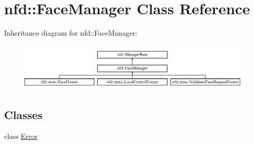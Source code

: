 \hypertarget{classnfd_1_1FaceManager}{}\section{nfd\+:\+:Face\+Manager Class Reference}
\label{classnfd_1_1FaceManager}
Inheritance diagram for nfd\+:\+:Face\+Manager\+:\begin{figure}[H]
\begin{center}
\leavevmode
\includegraphics[height=2.333333cm]{classnfd_1_1FaceManager}
\end{center}
\end{figure}
\subsection*{Classes}
\begin{DoxyCompactItemize}
\item 
class \hyperlink{classnfd_1_1FaceManager_1_1Error}{Error}
\end{DoxyCompactItemize}
